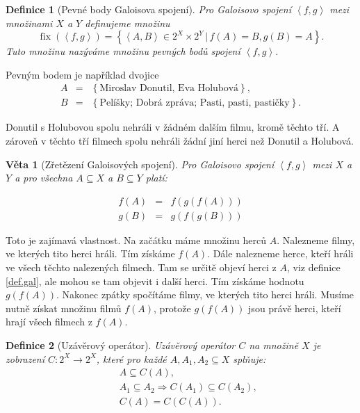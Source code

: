 \documentclass[12pt]{article}
\newcommand{\sep}{\,|\,}
\newcommand{\adds}[1]{\left\{#1\right\}}
\newcommand{\addsp}[1]{\left<#1\right>}
\renewcommand{\implies}{\Rightarrow}
\DeclareMathOperator{\fix}{fix}
\newtheorem{mydef}{Definice}
\newtheorem{theorem}{Věta}
\begin{document}
\begin{mydef}[Pevné body Galoisova spojení]
Pro Galoisovo spojení $\addsp{f, g}$ mezi množinami $X$ a $Y$ definujeme množinu
$$
\fix(\addsp{f,g})=\adds{\addsp{A,B}\in 2^X\times2^Y\sep f(A)=B, g(B)=A}.
$$
Tuto množinu nazýváme množinu pevných bodů spojení $\addsp{f,g}$. 
\end{mydef}

Pevným bodem je například dvojice 
\begin{eqnarray*}
A&=&\adds{\mbox{Miroslav Donutil, Eva Holubová}},\\
B&=& \adds{\mbox{Pelíšky; Dobrá zpráva; Pasti, pasti, pastičky}}.
\end{eqnarray*}

Donutil s Holubovou spolu nehráli v žádném dalším filmu, kromě těchto tří. A zároveň v těchto tří filmech spolu nehráli žádní jiní herci než Donutil a Holubová. 

\begin{theorem}[Zřetězení Galoisových spojení]\label{th.chain}
Pro Galoisovo spojení $\addsp{f,g}$ mezi $X$ a $Y$ a pro všechna $A\subseteq X$ a $B\subseteq Y$ platí:

\begin{eqnarray}
f(A)&=&f(g(f(A)))\\
g(B)&=&g(f(g(B)))
\end{eqnarray}
\end{theorem}

Toto je zajímavá vlastnost. Na začátku máme množinu herců $A$. Nalezneme filmy, ve kterých tito herci hráli. Tím získáme $f(A)$. Dále nalezneme herce, kteří hráli ve všech těchto nalezených filmech. Tam se určitě objeví herci z $A$, viz definice \ref{def.gal}, ale mohou se tam objevit i další herci. Tím získáme hodnotu $g(f(A))$. Nakonec zpátky spočítáme filmy, ve kterých tito herci hráli. Musíme nutně získat množinu filmů $f(A)$, protože $g(f(A))$ jsou právě herci, kteří hrají všech filmech z $f(A)$.

\begin{mydef}[Uzávěrový operátor]\label{def.clop}
Uzávěrový operátor $C$ na množině $X$ je zobrazení $C: 2^X\rightarrow2^X$, které pro každé $A, A_1, A_2\subseteq X$ splňuje:
\begin{eqnarray}
&&A\subseteq C(A),\\
&&A_1\subseteq A_2\implies C(A_1) \subseteq C(A_2),\\
&&C(A) = C(C(A)).
\end{eqnarray}
\end{mydef}
\end{document}
